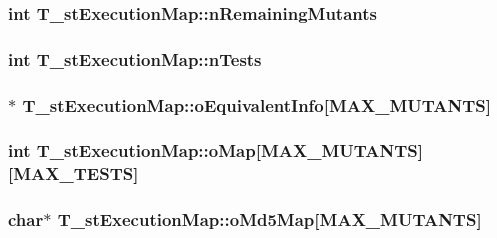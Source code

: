 \hypertarget{structT__stExecutionMap_ab3356d6f168b030b633e5f25b9a71c28}{
\subsubsection[{n\-Remaining\-Mutants}]{\setlength{\rightskip}{0pt plus 5cm}int T\-\_\-st\-Execution\-Map\-::n\-Remaining\-Mutants}}\label{structT__stExecutionMap_ab3356d6f168b030b633e5f25b9a71c28}
\hypertarget{structT__stExecutionMap_a8c17b23903f912f51cab70648be4fc75}{
\subsubsection[{n\-Tests}]{\setlength{\rightskip}{0pt plus 5cm}int T\-\_\-st\-Execution\-Map\-::n\-Tests}}\label{structT__stExecutionMap_a8c17b23903f912f51cab70648be4fc75}
\hypertarget{structT__stExecutionMap_a41d817d987562c2b69eb386534ceccce}{
\subsubsection[{o\-Equivalent\-Info}]{$\ast$ T\-\_\-st\-Execution\-Map\-::o\-Equivalent\-Info\mbox{[}{\bf M\-A\-X\-\_\-\-M\-U\-T\-A\-N\-T\-S}\mbox{]}}}\label{structT__stExecutionMap_a41d817d987562c2b69eb386534ceccce}
\hypertarget{structT__stExecutionMap_ab2e74b8fc17a93c7956c42b6155d64b1}{
\subsubsection[{o\-Map}]{\setlength{\rightskip}{0pt plus 5cm}int T\-\_\-st\-Execution\-Map\-::o\-Map\mbox{[}{\bf M\-A\-X\-\_\-\-M\-U\-T\-A\-N\-T\-S}\mbox{]}\mbox{[}{\bf M\-A\-X\-\_\-\-T\-E\-S\-T\-S}\mbox{]}}}\label{structT__stExecutionMap_ab2e74b8fc17a93c7956c42b6155d64b1}
\hypertarget{structT__stExecutionMap_a089e259cc95ab51ae1c134e389e739fb}{
\subsubsection[{o\-Md5\-Map}]{\setlength{\rightskip}{0pt plus 5cm}char$\ast$ T\-\_\-st\-Execution\-Map\-::o\-Md5\-Map\mbox{[}{\bf M\-A\-X\-\_\-\-M\-U\-T\-A\-N\-T\-S}\mbox{]}}}\label{structT__stExecutionMap_a089e259cc95ab51ae1c134e389e739fb}
